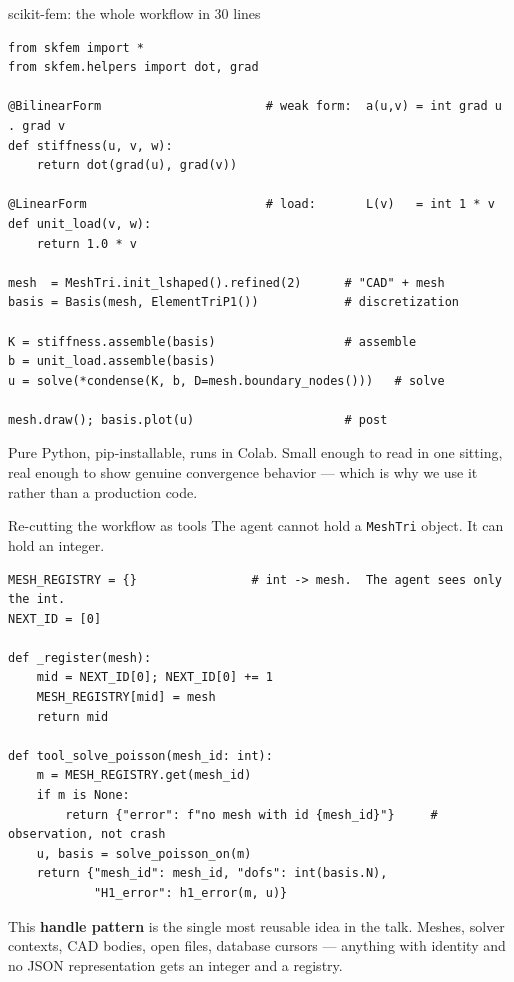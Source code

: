 \documentclass[aspectratio=169,10pt]{beamer}
\newcommand{\code}[1]{\texttt{\small #1}}
\newcommand{\hl}[1]{\textcolor{accent}{\textbf{#1}}}
\begin{document}
\begin{frame}[fragile]{scikit-fem: the whole workflow in 30 lines}
\begin{lstlisting}
from skfem import *
from skfem.helpers import dot, grad

@BilinearForm                       # weak form:  a(u,v) = int grad u . grad v
def stiffness(u, v, w):
    return dot(grad(u), grad(v))

@LinearForm                         # load:       L(v)   = int 1 * v
def unit_load(v, w):
    return 1.0 * v

mesh  = MeshTri.init_lshaped().refined(2)      # "CAD" + mesh
basis = Basis(mesh, ElementTriP1())            # discretization

K = stiffness.assemble(basis)                  # assemble
b = unit_load.assemble(basis)
u = solve(*condense(K, b, D=mesh.boundary_nodes()))   # solve

mesh.draw(); basis.plot(u)                     # post
\end{lstlisting}

\vspace{0.3em}
{\small Pure Python, pip-installable, runs in Colab. Small enough to read in one
sitting, real enough to show genuine convergence behavior --- which is why we
use it rather than a production code.}
\end{frame}

\begin{frame}[fragile]{Re-cutting the workflow as tools}
The agent cannot hold a \code{MeshTri} object. It can hold an integer.

\begin{lstlisting}
MESH_REGISTRY = {}                # int -> mesh.  The agent sees only the int.
NEXT_ID = [0]

def _register(mesh):
    mid = NEXT_ID[0]; NEXT_ID[0] += 1
    MESH_REGISTRY[mid] = mesh
    return mid

def tool_solve_poisson(mesh_id: int):
    m = MESH_REGISTRY.get(mesh_id)
    if m is None:
        return {"error": f"no mesh with id {mesh_id}"}     # observation, not crash
    u, basis = solve_poisson_on(m)
    return {"mesh_id": mesh_id, "dofs": int(basis.N),
            "H1_error": h1_error(m, u)}
\end{lstlisting}

\vspace{0.5em}
This \hl{handle pattern} is the single most reusable idea in the talk. Meshes,
solver contexts, CAD bodies, open files, database cursors --- anything with
identity and no JSON representation gets an integer and a registry.
\end{frame}
\end{document}
